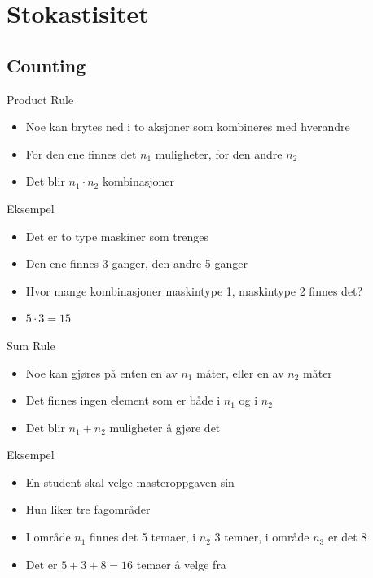 \section{Stokastisitet}
\subsection{Counting}
\begin{frame}
\begin{block}{Product Rule}
\begin{itemize}
\item Noe kan brytes ned i to aksjoner som kombineres med hverandre
\item For den ene finnes det $n_1$ muligheter, for den andre $n_2$
\item Det blir $n_1\cdot n_2$ kombinasjoner
\end{itemize}
\end{block}
\pause
\begin{block}{Eksempel}
\begin{itemize}
\item Det er to type maskiner som trenges
\item Den ene finnes 3 ganger, den andre 5 ganger
\item Hvor mange kombinasjoner maskintype 1, maskintype 2 finnes det?
\item $5\cdot 3=15$
\end{itemize}
\end{block}
\end{frame}

\begin{frame}
\begin{block}{Sum Rule}
\begin{itemize}
\item Noe kan gjøres på enten en av $n_1$ måter, eller en av $n_2$ måter
\item Det finnes ingen element som er både i $n_1$ og i $n_2$
\item Det blir $n_1+n_2$ muligheter å gjøre det
\end{itemize}
\end{block}
\pause
\begin{block}{Eksempel}
\begin{itemize}
\item En student skal velge masteroppgaven sin
\item Hun liker tre fagområder
\item I område $n_1$ finnes det 5 temaer, i $n_2$ 3 temaer, i område $n_3$ er det 8
\item Det er $5+3+8=16$ temaer å velge fra
\end{itemize}
\end{block}
\end{frame}

